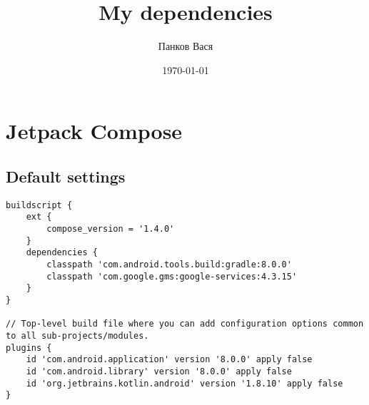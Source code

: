 \documentclass[11pt]{article}
\author{Панков Вася}
\date{\today}
\title{My dependencies}
\begin{document}
\maketitle

\section{Jetpack Compose}
\label{sec:org8440743}

\subsection{Default settings}
\label{sec:orgc213f89}
\begin{verbatim}
buildscript {
    ext {
        compose_version = '1.4.0'
    }
    dependencies {
        classpath 'com.android.tools.build:gradle:8.0.0'
        classpath 'com.google.gms:google-services:4.3.15'
    }
}

// Top-level build file where you can add configuration options common to all sub-projects/modules.
plugins {
    id 'com.android.application' version '8.0.0' apply false
    id 'com.android.library' version '8.0.0' apply false
    id 'org.jetbrains.kotlin.android' version '1.8.10' apply false
}
\end{verbatim}
\end{document}
